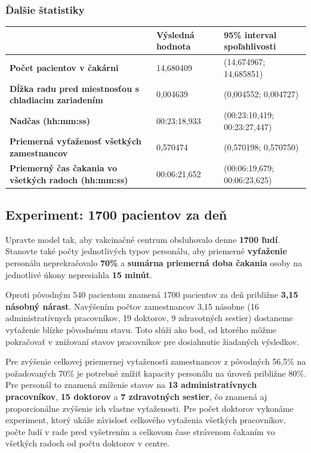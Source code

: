 \documentclass[letterpaper]{article}
\begin{document}
	\subsubsection*{Ďalšie štatistiky}
	
	\begin{table}[hbt!]
		\begin{tabular}{p{6cm}|p{4.5cm}p{4.5cm}}
			& \textbf{Výsledná hodnota} & \textbf{95\% interval spoľahlivosti} \\
			\hline\hline
			\textbf{Počet pacientov v čakárni} 								& 14,680409           & (14,674967; 14,685851)			
			\\\hline
			\textbf{Dĺžka radu pred miestnosťou s chladiacim zariadením}	& 0,004639            & (0,004552; 0,004727)	
			\\\hline
			\textbf{Nadčas (hh:mm:ss)}										& 00:23:18,933        & (00:23:10,419; 00:23:27,447)
			\\\hline
			\textbf{Priemerná vyťaženosť všetkých zamestnancov}  			& 0,570474            & (0,570198; 0,570750)
			\\\hline
			\textbf{Priemerný čas čakania vo všetkých radoch (hh:mm:ss)}	& 00:06:21,652        & (00:06:19,679; 00:06:23,625)
		\end{tabular}
	\end{table}

	\subsection{Experiment: 1700 pacientov za deň}
	
	Upravte model tak, aby vakcinačné centrum obsluhovalo denne \textbf{1700 ľudí}. Stanovte také počty jednotlivých typov personálu, aby priemerné \textbf{vyťaženie} personálu neprekračovalo \textbf{70\%} a \textbf{sumárna priemerná doba čakania} osoby na jednotlivé úkony nepresiahla \textbf{15 minút}.
	
	Oproti pôvodným 540 pacientom znamená 1700 pacientov za deň približne \textbf{3,15 násobný nárast}. Navýšením počtov zamestnancov 3,15 násobne (16 administratívnych pracovníkov, 19 doktorov, 9 zdravotných sestier) dostaneme vyťaženie blízke pôvodnému stavu. Toto slúži ako bod, od ktorého môžme pokračovať v znižovaní stavov pracovníkov pre dosiahnutie žiadaných výsledkov.
	
	Pre zvýšenie celkovej priemernej vyťaženosti zamestnancov z pôvodných 56,5\% na požadovaných 70\% je potrebné znížiť kapacity personálu na úroveň približne 80\%. Pre personál to znamená zníženie stavov na \textbf{13 administratívnych pracovníkov}, \textbf{15 doktorov} a \textbf{7 zdravotných sestier}, čo znamená aj proporcionálne zvýšenie ich vlastne vyťaženosti. Pre počet doktorov vykonáme experiment, ktorý ukáže závislosť celkového vyťaženia všetkých pracovníkov, počte ľudí v rade pred vyšetrením a celkovom čase strávenom čakaním vo všetkých radoch od počtu doktorov v centre.
	
\end{document}
